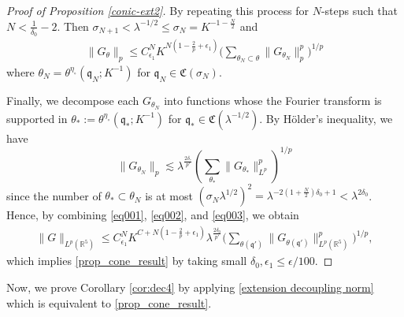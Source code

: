 \documentclass[10pt] %
{amsart}
\theoremstyle{plain}
\numberwithin{equation}{section}
\newcommand{\fq}{\mathfrak q}
\newcommand{\fm}{\mathfrak{q'}}
\begin{document}
\begin{proof}[Proof of Proposition \ref{conic-ext2}]
By repeating this process for $N$-steps such that $N <\frac 1{\delta_0}-2$. Then $\sigma_{N+1} < \lambda^{-1/2}\le \sigma_N=K^{-1 -\frac N 2}$ and  
\begin{align}\label{eq002}
\| G_{\theta}\|_p \le C_{\epsilon_1}^N K^{N(1-\frac {2}{p}+\epsilon_1)} \Big( \sum_{\theta_N\subset\theta} \|G_{\theta_N}\|_p^p\Big)^{1/p}
\end{align}
where $\theta_N=\theta^{\eta_\circ}(\fq_N;K^{-1})$ for $\fq_N \in \mathfrak C(\sigma_N)$. 

Finally, we decompose each $G_{\theta_N}$ into functions whose the Fourier transform is supported in $ \theta_\ast :=\theta^{\eta_\circ}(\fq_\ast;K^{-1})$ for $\fq_\ast\in \mathfrak C(\lambda^{-1/2})$.
By H\"older's inequality, we have 
\begin{equation}\label{eq003}
\| G_{\theta_N}\|_p \lesssim \lambda^{\frac{ 2\delta_\circ} {p'}} (\sum_{\theta_\ast} \| G_{\theta_\ast} \|_{L^p}^p)^{1/p} 
\end{equation}
since the number of $\theta_\ast\subset \theta_N$ is at most $ (\sigma_N\lambda^{1/2})^2 = \lambda^{-2(1+\frac N 2)\delta_0 + 1} < \lambda^{ 2\delta_0} $.  
Hence, by combining \eqref{eq001}, \eqref{eq002}, and \eqref{eq003}, we obtain 
\begin{align*} 
\big\|G \big\|_{L^p(\mathbb R^5)} \le  C_{\epsilon_1}^N  K^{ C + N (1-\frac2p +\epsilon_1)}  \lambda^{\frac{ 2\delta_0} {p'}} \Big( \sum_{\theta(\fm)} \| G_{\theta(\fm)}\|_{L^p(\mathbb R^5)}^p \Big)^{1/p},
\end{align*}
which implies \eqref{prop_cone_result} by taking small $\delta_0, \epsilon_1 \le \epsilon/100$.
\end{proof}

Now, we prove Corollary \ref{cor:dec4} by applying \eqref{extension decoupling norm} which is equivalent to  \eqref{prop_cone_result}.  
\end{document}
